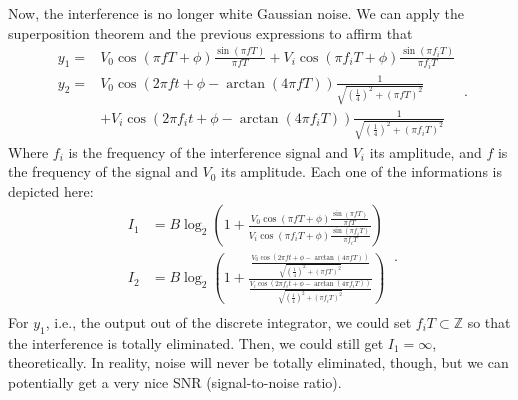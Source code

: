 \noindent Now, the interference is no longer white Gaussian noise. We can apply the superposition theorem and the previous expressions to affirm that
%
\begin{equation}
   \begin{split}
   y_1 =&  V_0 \cos(\pi f T + \phi) \frac{\sin(\pi f T)}{\pi f T} +  V_i \cos(\pi f_i T + \phi) \frac{\sin(\pi f_i T)}{\pi f_i T} \\
   y_2 =& V_0 \cos \left(  2 \pi f t + \phi - \arctan \left( 4 \pi f T \right) \right) \frac{1}{\sqrt{ \left(\frac{1}{4} \right)^2 + (\pi f T)^2}} \\ &+ V_i \cos \left(  2 \pi f_i t + \phi - \arctan \left( 4 \pi f_i T \right) \right) \frac{1}{\sqrt{ \left(\frac{1}{4} \right)^2 + (\pi f_i T)^2}}  
   \end{split} \ .
\end{equation}
\noindent Where $f_i$ is the frequency of the interference signal and $V_i$ its amplitude, and $f$ is the frequency of the signal and $V_0$ its amplitude. Each one of the informations is depicted here:
\begin{equation}
   \begin{split}
      I_1 &= B \log_2 \left(1 + \frac{ V_0 \cos(\pi f T + \phi) \frac{\sin(\pi f T)}{\pi f T} }{V_i \cos(\pi f_i T + \phi) \frac{\sin(\pi f_i T)}{\pi f_i T}}  \right)  \\
      I_2 &= B \log_2 \left(1 + \frac{ \frac{ V_0 \cos \left(  2 \pi f t + \phi - \arctan \left( 4 \pi f T \right) \right)}{\sqrt{ \left(\frac{1}{4} \right)^2 + (\pi f T)^2}} }{ \frac{ V_i \cos \left(  2 \pi f_i t + \phi - \arctan \left( 4 \pi f_i T \right) \right)}{\sqrt{ \left(\frac{1}{4} \right)^2 + (\pi f_i T)^2}} } \right)  \\
   \end{split} \ .
\end{equation}
%
\noindent For $y_1$, i.e., the output out of the discrete integrator, we could set  $f_i T \subset \mathbb{Z} $ so that the interference is totally eliminated. Then, we could still get $I_1=\infty$, theoretically. In reality, noise will never be totally eliminated, though, but we can potentially get a very nice SNR (signal-to-noise ratio).

